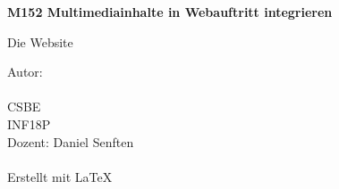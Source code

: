 
\begin{titlepage}
    \begin{center}
        \vspace*{2.5cm}

        \Huge
        \textbf{M152 Multimediainhalte in Webauftritt integrieren}

        \vspace{0.5cm}
        \LARGE
        Die Website

        \vfill


        \vspace{0.8cm}

        \Large
        Autor: \gitAuthorName\\
        \gitAuthorEmail\\
        CSBE\\
        INF18P\\
        Dozent: Daniel Senften\\
        \gitAuthorDate\\
        \small
        \vspace{1cm}
        Erstellt mit \LaTeX\\
        \vspace{1cm}
        \gitStyler
    \end{center}
\end{titlepage}